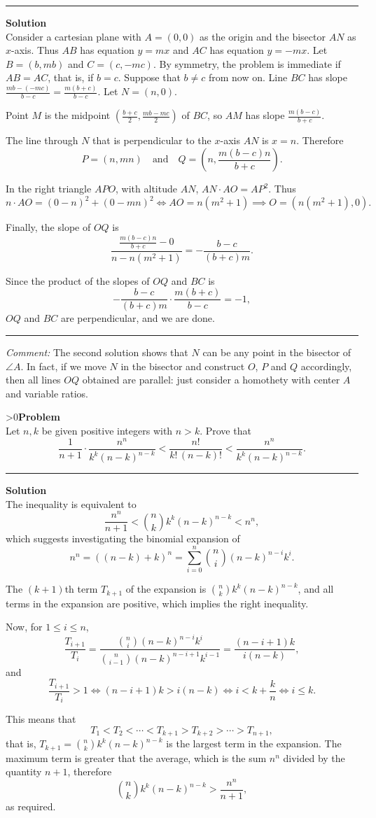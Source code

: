 \documentclass[12pt,oneside,a4paper]{book}
\newcounter{probnum}
\newcounter{solnum}
\newcommand{\prob}{\ifnum\value{probnum}>0\newpage\fi\setcounter{solnum}{0}\stepcounter{probnum}\textbf{Problem \theprobnum}\\}
\newcommand{\comment}{\medskip\hrule\medbreak\emph{Comment: }}
\newcommand{\sol}{\medskip\hrule\medbreak\textbf{Solution}\\}
\newcommand{\soln}{\stepcounter{solnum}\medskip\hrule\medbreak\textbf{Solution \thesolnum}\\}
\begin{document}
\soln
Consider a cartesian plane with $A=(0,0)$ as the origin and the bisector $AN$ as $x$-axis. Thus $AB$ has equation $y=mx$ and $AC$ has equation $y=-mx$. Let $B = (b,mb)$ and $C = (c,-mc)$. By symmetry, the problem is immediate if $AB=AC$, that is, if $b=c$. Suppose that $b\ne c$ from now on. Line $BC$ has slope $\frac{mb-(-mc)}{b-c} = \frac{m(b+c)}{b-c}$. Let $N = (n,0)$.

Point $M$ is the midpoint $\left(\frac{b+c}2,\frac{mb-mc}2\right)$ of $BC$, so $AM$ has slope $\frac{m(b-c)}{b+c}$.

The line through $N$ that is perpendicular to the $x$-axis $AN$ is $x=n$. Therefore
\[P = (n,mn)\quad\text{and}\quad Q = \left(n,\frac{m(b-c)n}{b+c}\right).\]

In the right triangle $APO$, with altitude $AN$, $AN\cdot AO = AP^2$. Thus
\[n\cdot AO = (0-n)^2 + (0-mn)^2 \iff AO = n(m^2+1)\implies O = (n(m^2+1),0).\]

Finally, the slope of $OQ$ is
\[\frac{\frac{m(b-c)n}{b+c} - 0}{n - n(m^2+1)} = -\frac{b-c}{(b+c)m}.\]

Since the product of the slopes of $OQ$ and $BC$ is
\[-\frac{b-c}{(b+c)m}\cdot\frac{m(b+c)}{b-c}=-1,\]
$OQ$ and $BC$ are perpendicular, and we are done.

\comment
The second solution shows that $N$ can be any point in the bisector of $\angle A$. In fact, if we move $N$ in the bisector and construct $O$, $P$ and $Q$ accordingly, then all lines $OQ$ obtained are parallel: just consider a homothety with center $A$ and variable ratios.

\prob Let $n,k$ be given positive integers with $n>k$. Prove that
\[\frac1{n+1}\cdot \frac{n^n}{k^k(n-k)^{n-k}} < \frac{n!}{k!\,(n-k)!} < \frac{n^n}{k^k(n-k)^{n-k}}.\]

\sol
The inequality is equivalent to
\[\frac{n^n}{n+1} < \binom nk k^k(n-k)^{n-k} < n^n,\]
which suggests investigating the binomial expansion of
\[n^n = ((n-k)+k)^n = \sum_{i=0}^n \binom ni (n-k)^{n-i}k^i.\]

The $(k+1)$th term $T_{k+1}$ of the expansion is $\binom nk k^k(n-k)^{n-k}$, and all terms in the expansion are positive, which implies the right inequality.

Now, for $1\le i\le n$,
\[\frac{T_{i+1}}{T_i} = \frac{\binom ni (n-k)^{n-i}k^i}{\binom n{i-1} (n-k)^{n-i+1}k^{i-1}}
= \frac{(n-i+1)k}{i(n-k)},\]
and
\[\frac{T_{i+1}}{T_i} > 1 \iff (n-i+1)k > i(n-k)\iff i < k + \frac kn\iff i\le k.\]

This means that
\[T_1 < T_2 < \cdots < T_{k+1} > T_{k+2} > \cdots > T_{n+1},\]
that is, $T_{k+1} = \binom nk k^k(n-k)^{n-k}$ is the largest term in the expansion. The maximum term is greater that the average, which is the sum $n^n$ divided by the quantity $n+1$, therefore
\[\binom nk k^k(n-k)^{n-k} > \frac{n^n}{n+1},\]
as required.
\end{document}

